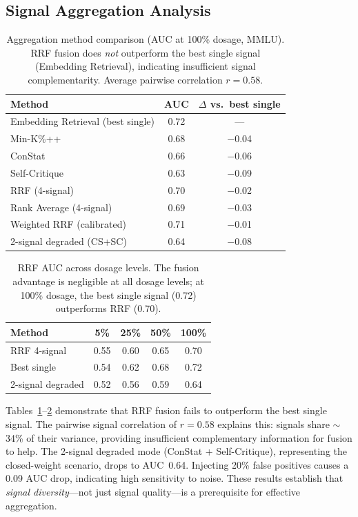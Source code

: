 \documentclass[letterpaper, 10pt, twocolumn]{article}
\begin{document}
\subsection{Signal Aggregation Analysis}
\label{sec:rrf}

\begin{table}[t]
\centering
\caption{Aggregation method comparison (AUC at 100\% dosage, MMLU). RRF fusion does \emph{not} outperform the best single signal (Embedding Retrieval), indicating insufficient signal complementarity. Average pairwise correlation $r = 0.58$.}
\label{tab:rrf_comparison}
\small
\begin{tabular}{lcc}
\toprule
Method & AUC & $\Delta$ vs.\ best single \\
\midrule
Embedding Retrieval (best single) & 0.72 & --- \\
Min-K\%++ & 0.68 & $-$0.04 \\
ConStat & 0.66 & $-$0.06 \\
Self-Critique & 0.63 & $-$0.09 \\
\midrule
RRF (4-signal) & 0.70 & $-$0.02 \\
Rank Average (4-signal) & 0.69 & $-$0.03 \\
Weighted RRF (calibrated) & 0.71 & $-$0.01 \\
2-signal degraded (CS+SC) & 0.64 & $-$0.08 \\
\bottomrule
\end{tabular}
\end{table}

\begin{table}[t]
\centering
\caption{RRF AUC across dosage levels. The fusion advantage is negligible at all dosage levels; at 100\% dosage, the best single signal (0.72) outperforms RRF (0.70).}
\label{tab:rrf_dosage}
\small
\begin{tabular}{lcccc}
\toprule
Method & 5\% & 25\% & 50\% & 100\% \\
\midrule
RRF 4-signal & 0.55 & 0.60 & 0.65 & 0.70 \\
Best single & 0.54 & 0.62 & 0.68 & 0.72 \\
2-signal degraded & 0.52 & 0.56 & 0.59 & 0.64 \\
\bottomrule
\end{tabular}
\end{table}

Tables~\ref{tab:rrf_comparison}--\ref{tab:rrf_dosage} demonstrate that RRF fusion fails to outperform the best single signal.
The pairwise signal correlation of $r = 0.58$ explains this: signals share $\sim$34\% of their variance, providing insufficient complementary information for fusion to help.
The 2-signal degraded mode (ConStat + Self-Critique), representing the closed-weight scenario, drops to AUC~0.64.
Injecting 20\% false positives causes a 0.09 AUC drop, indicating high sensitivity to noise.
These results establish that \emph{signal diversity}---not just signal quality---is a prerequisite for effective aggregation.
\end{document}
